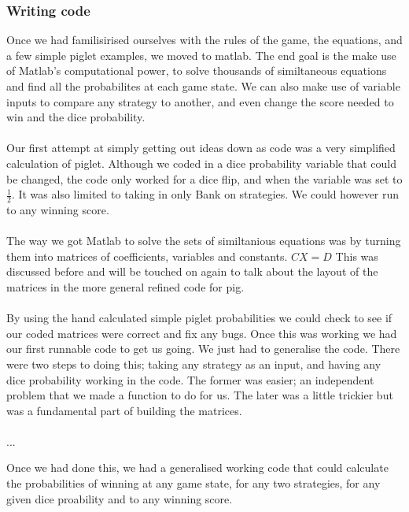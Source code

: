 \documentclass[a4paper,titlepage]{article}
\begin{document}
\subsubsection{Writing code}
Once we had familisirised ourselves with the rules of the game, the equations, and
a few simple piglet examples, we moved to matlab.
The end goal is the make use of Matlab's computational power, to solve thousands of
similtaneous equations and find all the probabilites at each game state.
We can also make use of variable inputs to compare any strategy to another, and
even change the score needed to win and the dice probability.
\\
\\
Our first attempt at simply getting out ideas down as code was a very simplified
calculation of piglet. Although we coded in a dice probability variable that could be changed,
the code only worked for a dice flip, and when the variable was set to $\frac{1}{2}$.
It was also limited to taking in only Bank on strategies.
We could however run to any winning score.
\\
\\
The way we got Matlab to solve the sets of similtanious equations was by turning them into
matrices of coefficients, variables and constants. $CX=D$ This was discussed before
and will be touched on again to talk about the layout of the matrices in the more general
refined code for pig.
\\
\\
By using the hand calculated simple piglet probabilities we could check to see if our
coded matrices were correct and fix any bugs. Once this was working we had our first
runnable code to get us going. We just had to generalise the code.
There were two steps to doing this; taking any strategy as an input, and having any
dice probability working in the code. The former was easier; an independent problem that we
made a function to do for us. The later was a little trickier but was a fundamental part
of building the matrices.
\\
\\


...

Once we had done this, we had a generalised working code that could calculate the
probabilities of winning at any game state, for any two strategies, for any given
dice proability and to any winning score.
\end{document}
